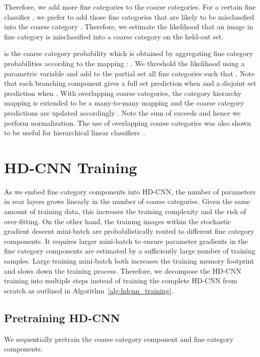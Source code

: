 \documentclass[10pt,twocolumn,letterpaper]{article}
\begin{document}
Therefore, we add more fine categories to the coarse categories. For a certain fine classifier , we prefer to add those fine categories  that are likely to be misclassfied into the coarse category . Therefore, we estimate the likelihood  that an image in fine category  is misclassified into a coarse category  on the held-out set. 

\vspace{-0.5em}

 is the coarse category probability which is obtained by aggregating fine category probabilities  according to the mapping : . We threshold the likelihood   
using a parametric variable   
and add to the partial set  all fine categories  such that . 
Note that each branching component gives a full set prediction when  and a disjoint set prediction when . With overlapping coarse categories, the category hierarchy mapping  is extended to be a many-to-many mapping  and the coarse category predictions are updated accordingly . Note the sum of  exceeds  and hence we perform  normalization. The use of overlapping coarse categories was also shown to be useful for hierarchical linear classifiers~\cite{marszalek2008constructing}.


\section{HD-CNN Training}
\label{sec:training}

As we embed fine category components into HD-CNN, the number of parameters in rear layers grows linearly in the number of coarse categories. Given the same amount of training data, this increases the training complexity and the risk of over-fitting. On the other hand, the training images within the stochastic gradient descent mini-batch are probabilistically routed to different fine category components. It requires larger mini-batch to ensure parameter gradients in the fine category components are estimated by a sufficiently large number of training samples. Large training mini-batch both increases the training memory footprint and slows down the training process. Therefore, we decompose the HD-CNN training into multiple steps instead of training the complete HD-CNN from scratch as outlined in Algorithm~\ref{alg:hdcnn_training}.



\subsection{Pretraining HD-CNN}
We sequentially pretrain the coarse category component and fine category components.
\end{document}
